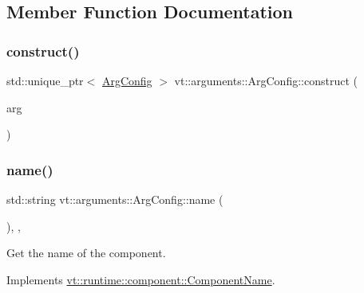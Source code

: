\subsection{Member Function Documentation}
\mbox{\label{structvt_1_1arguments_1_1_arg_config_a2248f3913b93ca336fdac5c2ec9c6e0b}} 
\subsubsection{\texorpdfstring{construct()}{construct()}}
{\footnotesize\ttfamily std\+::unique\+\_\+ptr$<$ \hyperlink{structvt_1_1arguments_1_1_arg_config}{Arg\+Config} $>$ vt\+::arguments\+::\+Arg\+Config\+::construct (\begin{DoxyParamCaption}\item[{std\+::unique\+\_\+ptr$<$ \hyperlink{structvt_1_1arguments_1_1_arg_config}{Arg\+Config} $>$}]{arg }\end{DoxyParamCaption})\hspace{0.3cm}{\ttfamily [static]}}

\mbox{\label{structvt_1_1arguments_1_1_arg_config_ade5e5994235f0953970fc3f460f9167a}} 
\subsubsection{\texorpdfstring{name()}{name()}}
{\footnotesize\ttfamily std\+::string vt\+::arguments\+::\+Arg\+Config\+::name (\begin{DoxyParamCaption}{ }\end{DoxyParamCaption})\hspace{0.3cm}{\ttfamily [inline]}, {\ttfamily [override]}, {\ttfamily [virtual]}}



Get the name of the component. 



Implements \hyperlink{structvt_1_1runtime_1_1component_1_1_component_name_a33c06229bb605a2b2ceff68830d6d773}{vt\+::runtime\+::component\+::\+Component\+Name}.

